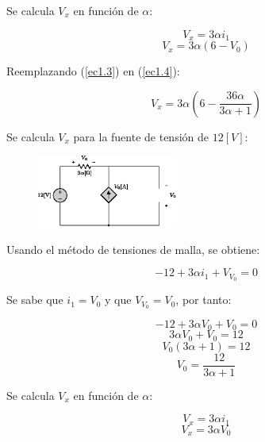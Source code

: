 \documentclass[letter,11pt]{article}
\begin{document}
\begin{enumerate}
Se calcula $V_x$ en función de $\alpha$:

\begin{equation*}
    V_x = 3\alpha i_1
\end{equation*}
\begin{equation}
    V_x = 3\alpha (6 - V_0)
    \label{ec1.4}
\end{equation}

Reemplazando (\ref{ec1.3}) en (\ref{ec1.4}):

\begin{equation}
    V_x = 3\alpha \left(6 - \frac{36\alpha}{3\alpha + 1}\right)
    \label{ec1.5}
\end{equation}

Se calcula $V_x$ para la fuente de tensión de $12[V]$:

\begin{figure}[!h]
\centering
\includegraphics[width=0.41\textwidth]{resources/figura3.eps}
\end{figure}

Usando el método de tensiones de malla, se obtiene:

\begin{equation}
    -12 + 3\alpha i_1 + V_{V_0} = 0
    \label{ec2.1}
\end{equation}

Se sabe que $i_1 = V_0$ y que $V_{V_0} = V_0$, por tanto:

\begin{equation*}
    -12 + 3\alpha V_0 + V_0 = 0
\end{equation*}
\begin{equation*}
    3\alpha V_0 + V_0 = 12
\end{equation*}
\begin{equation*}
    V_0 (3\alpha + 1) = 12
\end{equation*}
\begin{equation}
    V_0 = \frac{12}{3\alpha + 1}
    \label{ec2.2}
\end{equation}

Se calcula $V_x$ en función de $\alpha$:

\begin{equation*}
    V_x = 3\alpha i_1
\end{equation*}
\begin{equation}
    V_x = 3\alpha V_0
    \label{ec2.3}
\end{equation}


\end{enumerate}
\end{document}
